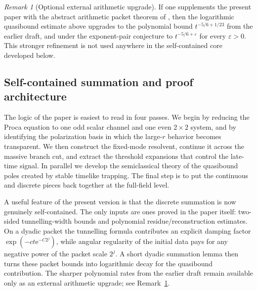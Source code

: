 \documentclass[12pt]{article}
\numberwithin{equation}{section}
\theoremstyle{plain}
\theoremstyle{definition}
\theoremstyle{remark}
\newtheorem{remark}{Remark}[section]
\newcommand{\ee}{\mathrm e}
\newcommand{\eps}{\varepsilon}
\begin{document}
\begin{remark}[Optional external arithmetic upgrade]\label{rem:external_packet_upgrade}
If one supplements the present paper with the abstract arithmetic packet theorem of \cite{ShlapentokhRothmanVanDeMoortel2026}, then the logarithmic quasibound estimate above upgrades to the polynomial bound $t^{-5/6+1/23}$ from the earlier draft, and under the exponent-pair conjecture to $t^{-5/6+\eps}$ for every $\eps>0$.  This stronger refinement is not used anywhere in the self-contained core developed below.
\end{remark}


\subsection{Self-contained summation and proof architecture}

The logic of the paper is easiest to read in four passes.  We begin by reducing the Proca equation to one odd scalar channel and one even $2\times2$ system, and by identifying the polarization basis in which the large-$r$ behavior becomes transparent.  We then construct the fixed-mode resolvent, continue it across the massive branch cut, and extract the threshold expansions that control the late-time signal.  In parallel we develop the semiclassical theory of the quasibound poles created by stable timelike trapping.  The final step is to put the continuous and discrete pieces back together at the full-field level.

A useful feature of the present version is that the discrete summation is now genuinely self-contained.  The only inputs are ones proved in the paper itself: two-sided tunnelling-width bounds and polynomial residue/reconstruction estimates.  On a dyadic packet the tunnelling formula contributes an explicit damping factor $\exp(-ct\ee^{-C2^j})$, while angular regularity of the initial data pays for any negative power of the packet scale $2^j$.  A short dyadic summation lemma then turns these packet bounds into logarithmic decay for the quasibound contribution.  The sharper polynomial rates from the earlier draft remain available only as an external arithmetic upgrade; see Remark~\ref{rem:external_packet_upgrade}.
\end{document}
